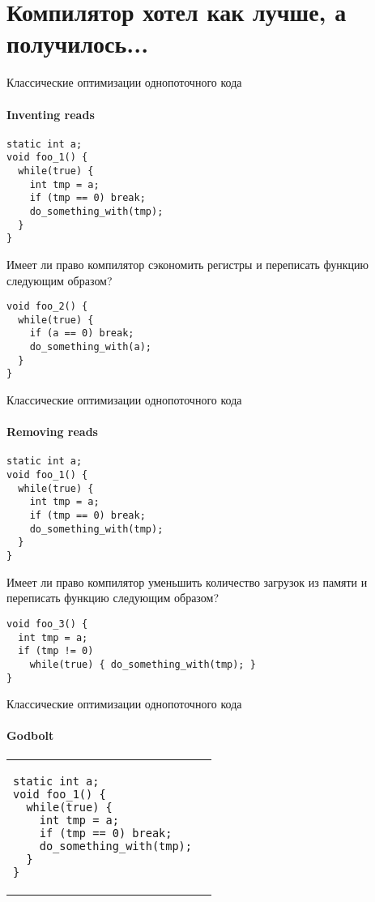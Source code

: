 
\section{Компилятор хотел как лучше, а получилось...}
\showTOC


\begin{frame}[t,fragile]{Классические оптимизации однопоточного кода}
\framesubtitle{Inventing reads}

\begin{verbatim}
static int a;
void foo_1() {
  while(true) {
    int tmp = a;
    if (tmp == 0) break;
    do_something_with(tmp);
  }
}
\end{verbatim}

\pause
Имеет ли право компилятор сэкономить регистры и переписать функцию следующим образом?

\begin{verbatim}
void foo_2() {
  while(true) {
    if (a == 0) break;
    do_something_with(a);
  }
}
\end{verbatim}

\end{frame}


\begin{frame}[t,fragile]{Классические оптимизации однопоточного кода}
\framesubtitle{Removing reads}

\begin{verbatim}
static int a;
void foo_1() {
  while(true) {
    int tmp = a;
    if (tmp == 0) break;
    do_something_with(tmp);
  }
}
\end{verbatim}

\pause

Имеет ли право компилятор уменьшить количество загрузок из памяти и переписать функцию следующим образом?

\begin{verbatim}
void foo_3() {
  int tmp = a;
  if (tmp != 0)
    while(true) { do_something_with(tmp); }
}
\end{verbatim}
\end{frame}




\begin{frame}[t, fragile]{Классические оптимизации однопоточного кода}
\framesubtitle{Godbolt}


\begin{tabular}{p{} p{}}


\begin{verbatim}
static int a;
void foo_1() {
  while(true) {
    int tmp = a;
    if (tmp == 0) break;
    do_something_with(tmp);
  }
}
\end{verbatim}

&

\end{tabular}
\end{frame}


